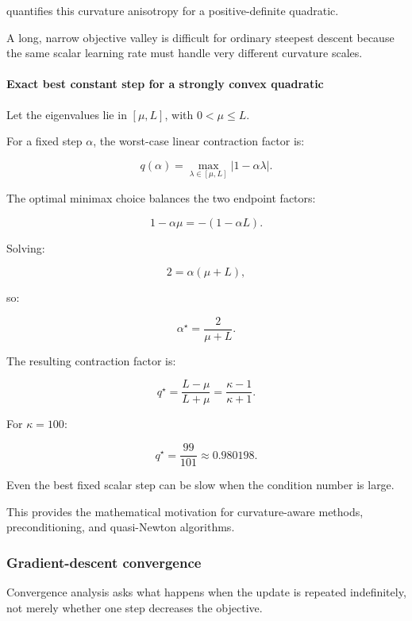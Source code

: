 quantifies this curvature anisotropy for a positive-definite quadratic.

A long, narrow objective valley is difficult for ordinary steepest descent because the same scalar learning rate must handle very different curvature scales.

\paragraph{Exact best constant step for a strongly convex quadratic}\label{02-foundations-ii-ch026-exact-best-constant-step-for-a-strongly-convex-quadratic}

\hypertarget{02-foundations-ii-ch026-exact-best-constant-step-for-a-strongly-convex-quadratic}{}

Let the eigenvalues lie in \([\mu,L]\), with \(0<\mu\le L\).

For a fixed step \(\alpha\), the worst-case linear contraction factor is:

\[
q(\alpha)= \max_{\lambda\in[\mu,L]} |1-\alpha\lambda|.
\]

The optimal minimax choice balances the two endpoint factors:

\[
1-\alpha\mu=-(1-\alpha L).
\]

Solving:

\[
2=\alpha(\mu+L),
\]

so:

\[
\boxed{ \alpha^\star=\frac2{\mu+L} }.
\]

The resulting contraction factor is:

\[
\boxed{ q^\star=\frac{L-\mu}{L+\mu} =\frac{\kappa-1}{\kappa+1} }.
\]

For \(\kappa=100\):

\[
q^\star=\frac{99}{101}\approx0.980198.
\]

Even the best fixed scalar step can be slow when the condition number is large.

This provides the mathematical motivation for curvature-aware methods, preconditioning, and quasi-Newton algorithms.

\subsubsection{Gradient-descent convergence}\label{02-foundations-ii-ch026-gradient-descent-convergence}

\hypertarget{02-foundations-ii-ch026-gradient-descent-convergence}{}

Convergence analysis asks what happens when the update is repeated indefinitely, not merely whether one step decreases the objective.

